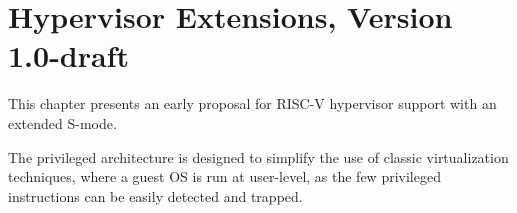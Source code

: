 \chapter{Hypervisor Extensions, Version 1.0-draft}
\label{hypervisor}

This chapter presents an early proposal for RISC-V hypervisor support
with an extended S-mode.

\begin{commentary}
The privileged architecture is designed to simplify the use of classic
virtualization techniques, where a guest OS is run at user-level, as
the few privileged instructions can be easily detected and trapped.
\end{commentary}
